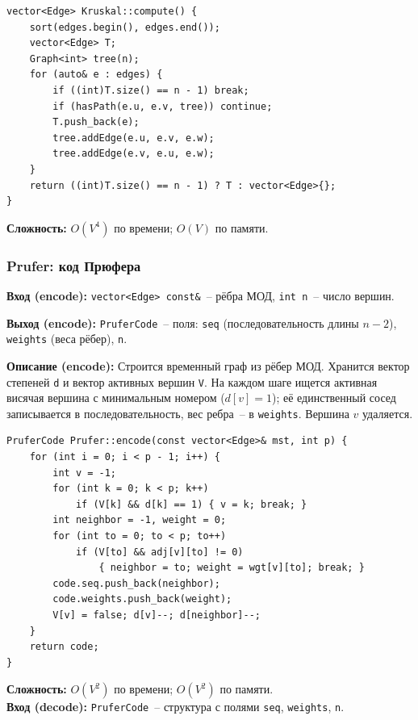 \begin{lstlisting}[style=cstyle, caption={Основной цикл алгоритма Краскала (kruskal.cpp)}]
vector<Edge> Kruskal::compute() {
    sort(edges.begin(), edges.end());
    vector<Edge> T;
    Graph<int> tree(n);
    for (auto& e : edges) {
        if ((int)T.size() == n - 1) break;
        if (hasPath(e.u, e.v, tree)) continue;
        T.push_back(e);
        tree.addEdge(e.u, e.v, e.w);
        tree.addEdge(e.v, e.u, e.w);
    }
    return ((int)T.size() == n - 1) ? T : vector<Edge>{};
}
\end{lstlisting}

\textbf{Сложность:} $O(V^4)$ по времени;
$O(V)$ по памяти.

\subsubsection{Prufer: код Прюфера}

\textbf{Вход (encode):} \texttt{vector<Edge> const\&}~-- рёбра МОД,
\texttt{int n}~-- число вершин.

\textbf{Выход (encode):} \texttt{PruferCode}~-- поля: \texttt{seq}
(последовательность длины $n-2$), \texttt{weights} (веса рёбер),
\texttt{n}.

\textbf{Описание (encode):} Строится временный граф из рёбер МОД.
Хранится вектор степеней \texttt{d} и вектор активных вершин \texttt{V}.
На каждом шаге ищется активная висячая вершина с минимальным номером
($d[v] = 1$); её единственный сосед записывается в последовательность,
вес ребра~-- в \texttt{weights}. Вершина $v$ удаляется.

\begin{lstlisting}[style=cstyle, caption={Кодирование в код Прюфера с сохранением весов (prufer.cpp)}]
PruferCode Prufer::encode(const vector<Edge>& mst, int p) {
    for (int i = 0; i < p - 1; i++) {
        int v = -1;
        for (int k = 0; k < p; k++)
            if (V[k] && d[k] == 1) { v = k; break; }
        int neighbor = -1, weight = 0;
        for (int to = 0; to < p; to++)
            if (V[to] && adj[v][to] != 0)
                { neighbor = to; weight = wgt[v][to]; break; }
        code.seq.push_back(neighbor);
        code.weights.push_back(weight);
        V[v] = false; d[v]--; d[neighbor]--;
    }
    return code;
}
\end{lstlisting}

\textbf{Сложность:} $O(V^2)$ по времени; $O(V^2)$ по памяти.
\\

\textbf{Вход (decode):} \texttt{PruferCode}~-- структура с полями
\texttt{seq}, \texttt{weights}, \texttt{n}.

